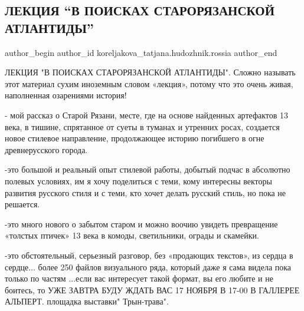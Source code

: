  
 
 
 
 
 
\subsection{ЛЕКЦИЯ \enquote{В ПОИСКАХ СТАРОРЯЗАНСКОЙ АТЛАНТИДЫ}}
\label{sec:16_11_2018.fb.koreljakova_tatjana.hudozhnik.rossia.1.lekcia_starorjazan_atlantida}
 
\ifcmt
 author_begin
   author_id koreljakova_tatjana.hudozhnik.rossia
 author_end
\fi

ЛЕКЦИЯ "В ПОИСКАХ СТАРОРЯЗАНСКОЙ АТЛАНТИДЫ". Сложно называть этот материал
сухим иноземным словом «лекция», потому что это очень живая,    наполненная
озарениями история!


- мой рассказ о Старой Рязани, месте, где на основе найденных артефактов 13
века, в тишине, спрятанное от суеты в туманах и утренних росах, создается новое
стилевое направление, продолжающее историю погибшего в огне древнерусского
города.


-это большой и реальный опыт стилевой работы, добытый подчас в абсолютно
полевых условиях, им я хочу поделиться с теми, кому интересны векторы развития
русского стиля и с теми, кто хочет делать русский стиль, но пока не решается.

-это много нового о забытом старом и можно воочию увидеть превращение «толстых
птичек» 13 века в комоды, светильники, ограды и скамейки.


-это обстоятельный, серьезный разговор, без «продающих текстов», из сердца в
сердце... более 250 файлов визуального ряда, который даже я сама видела пока
только по частям ...если вас интересует такой формат, вы его любите и не
боитесь, то УЖЕ ЗАВТРА БУДУ ЖДАТЬ ВАС 17 НОЯБРЯ В 17-00 В ГАЛЛЕРЕЕ АЛЬПЕРТ.
площадка выставки" Трын-трава".

